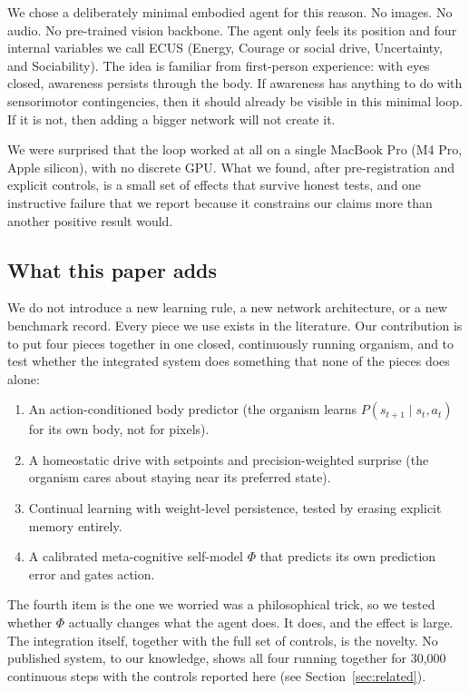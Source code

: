 \documentclass[11pt,a4paper]{article}
\begin{document}
We chose a deliberately minimal embodied agent for this reason. No images. No audio. No pre-trained vision backbone. The agent only feels its position and four internal variables we call ECUS (Energy, Courage or social drive, Uncertainty, and Sociability). The idea is familiar from first-person experience: with eyes closed, awareness persists through the body. If awareness has anything to do with sensorimotor contingencies, then it should already be visible in this minimal loop. If it is not, then adding a bigger network will not create it.

We were surprised that the loop worked at all on a single MacBook Pro (M4 Pro, Apple silicon), with no discrete GPU. What we found, after pre-registration and explicit controls, is a small set of effects that survive honest tests, and one instructive failure that we report because it constrains our claims more than another positive result would.

\subsection{What this paper adds}

We do not introduce a new learning rule, a new network architecture, or a new benchmark record. Every piece we use exists in the literature. Our contribution is to put four pieces together in one closed, continuously running organism, and to test whether the integrated system does something that none of the pieces does alone:

\begin{enumerate}[leftmargin=1.2em]
    \item An action-conditioned body predictor (the organism learns $P(s_{t+1} \mid s_t, a_t)$ for its own body, not for pixels).
    \item A homeostatic drive with setpoints and precision-weighted surprise (the organism cares about staying near its preferred state).
    \item Continual learning with weight-level persistence, tested by erasing explicit memory entirely.
    \item A calibrated meta-cognitive self-model $\Phi$ that predicts its own prediction error and gates action.
\end{enumerate}

The fourth item is the one we worried was a philosophical trick, so we tested whether $\Phi$ actually changes what the agent does. It does, and the effect is large. The integration itself, together with the full set of controls, is the novelty. No published system, to our knowledge, shows all four running together for 30,000 continuous steps with the controls reported here (see Section~\ref{sec:related}).
\end{document}
